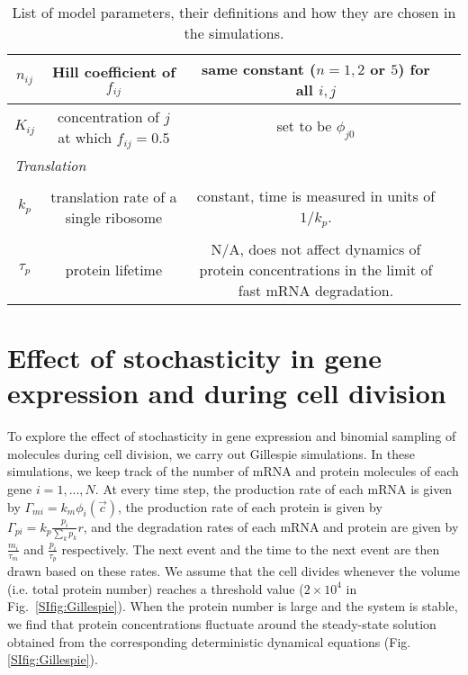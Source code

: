 \documentclass[10pt]{article}
\begin{document}
\begin{table}[h]
\begin{center}
\begin{tabular}{|c | c | c | c |}
 \hline
 $n_{ij}$ & Hill coefficient of $f_{ij}$ & same constant ($n = 1, 2$ or $5$) for all $i,j$ \\
 \hline
 $K_{ij}$ & concentration of $j$ at which $f_{ij} = 0.5$ & set to be $\phi_{j0}$  \\ 
 \hline\hline
 \multicolumn{3}{|l|}{\textit{Translation}} \\
 \hline
   &  & \multirow{3}{16em}{constant, time is measured in units of $1/k_p$.}  \\ 
  $k_p$ & translation rate of a single ribosome & \\
  & & \\
 \hline
  &  & \multirow{3}{16em}{N/A, does not affect dynamics of protein concentrations in the limit of fast mRNA degradation.}    \\
 $\tau_p$ & protein lifetime & \\
 & & \\
 \hline
\end{tabular}
\caption{List of model parameters, their definitions and how they are chosen in the simulations.\label{tab:params}}
\end{center}
\end{table}

\section{Effect of stochasticity in gene expression and during cell division}
\label{sec:Gillespie}

To explore the effect of stochasticity in gene expression and binomial sampling of molecules during cell division, we carry out Gillespie simulations. In these simulations, we keep track of the number of mRNA and protein molecules of each gene $i = 1,..., N$. At every time step, the production rate of each mRNA is given by $\Gamma_{mi} = k_m \phi_i(\vec{c})$, the production rate of each protein is given by $\Gamma_{pi} = k_p \frac{p_i}{\sum_k p_k} r$, and the degradation rates of each mRNA and protein are given by $\frac{m_i}{\tau_m}$ and $\frac{p_i}{\tau_p}$ respectively. The next event and the time to the next event are then drawn based on these rates. We assume that the cell divides whenever the volume (i.e. total protein number) reaches a threshold value ($2 \times 10^4$ in Fig.~\ref{SIfig:Gillespie}). When the protein number is large and the system is stable, we find that protein concentrations fluctuate around the steady-state solution obtained from the corresponding deterministic dynamical equations (Fig. \ref{SIfig:Gillespie}).
\end{document}

